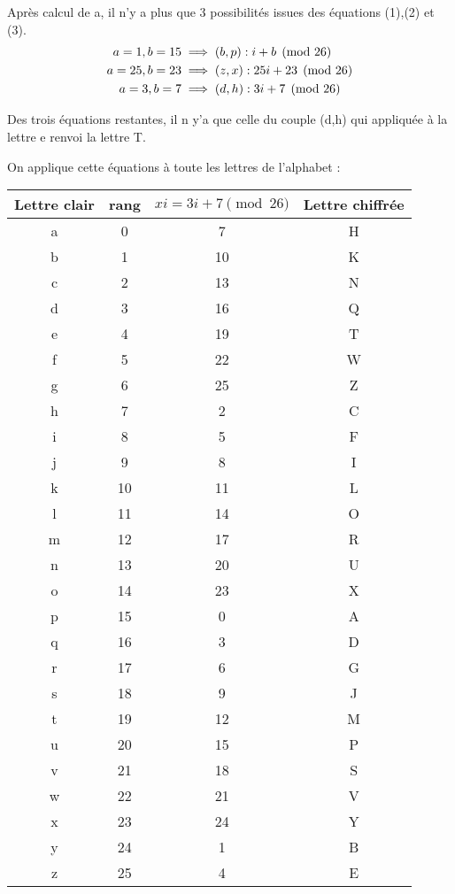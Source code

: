 \documentclass[a4paper,10pt]{article}
\begin{document}
\begin{enumerate}
Après calcul de a, il n'y a plus que 3 possibilités issues des équations (1),(2) et (3).
\begin{align}
a=1,b=15 &\implies (b,p) : i+b \pmod{26} \notag \\
a=25,b=23 &\implies (z,x):25i+23 \pmod{26} \notag \\
a=3,b=7 &\implies (d,h) : 3i+7 \pmod{26} \notag 
\end{align}

Des trois équations restantes, il n y'a que celle du couple (d,h) qui appliquée à la lettre e renvoi la lettre T.

On applique cette équations à toute les lettres de l'alphabet :

\begin{center}

\begin{tabular}{|c|c|c|c|}
	\hline 
	Lettre clair & rang & $xi=3i+7\pmod{26}$ & Lettre chiffrée \\ 
	\hline
	a	& 0	& 7	& H\\ 
	\hline
	b	& 1	& 10	& K\\ 
	\hline
	c	& 2	& 13	& N\\ 
	\hline
	d	& 3	& 16	& Q\\ 
	\hline
	e	& 4	& 19	& T\\ 
	\hline
	f	& 5	& 22	& W\\ 
	\hline
	g	& 6	& 25	& Z\\ 
	\hline
	h	& 7	& 	2	& C\\ 
	\hline
	i	& 8	& 	5	& F\\ 
	\hline
	j	& 9	& 	8	& I\\ 
	\hline
	k	& 10	& 	11& 	L\\ 
	\hline
	l	& 11	& 	14& 	O\\ 
	\hline
	m	& 12	& 	17	& R\\ 
	\hline
	n	& 13	& 20	& U\\ 
	\hline
	o	& 14	& 	23	& X\\ 
	\hline
	p	& 15	& 	0	& A\\ 
	\hline
	q	& 16	& 	3	& D\\ 
	\hline
	r	& 17	& 	6	& G\\ 
	\hline
	s	& 18	& 	9	& J\\ 
	\hline
	t	& 19	& 	12	& M\\ 
	\hline
	u	& 20	& 15	& P\\ 
	\hline
	v	& 21	& 	18	& S\\ 
	\hline
	w	& 22	& 	21	& V\\ 
	\hline
	x	& 23	& 	24	& Y\\ 
	\hline
	y	& 24	& 	1	& B\\ 
	\hline
	z	& 25	& 	4	& E\\ 
	\hline
	\end{tabular} 	
\end{center}


\end{enumerate}
\end{document}
